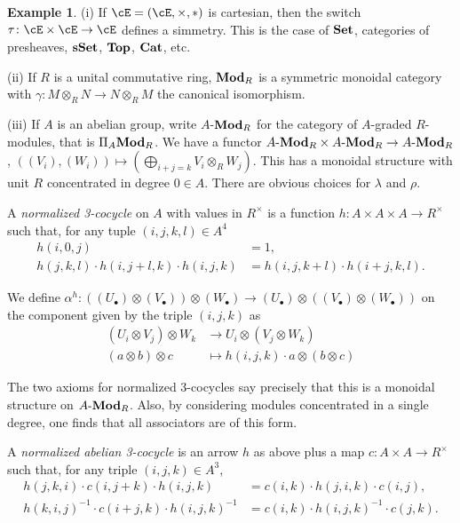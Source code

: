 \documentclass[a4paper,11pt,oneside,openany]{scrbook}
\newcommand{\catname}[1]{{\normalfont\textbf{#1}}}
\newcommand{\Set}{\catname{Set}}
\newcommand{\Top}{\catname{Top}}
\newcommand{\Mod}{\catname{Mod}}
\newcommand{\sSet}{\catname{sSet}}
\newcommand{\Cat}{\catname{Cat}}
\theoremstyle{definition}
\theoremstyle{definition}
\newtheorem{exmp}[thm]{Example}
\begin{document}
\begin{exmp}
\item[(i)] If $\cE=(\cE,\times,*)$ is cartesian, then the switch $\tau\colon\cE\times\cE\rightarrow\cE$ defines a simmetry. This is the case of $\Set$, categories of presheaves, $\sSet$, $\Top$, $\Cat$, etc.

\item[(ii)] If $R$ is a unital commutative ring, $\Mod_R$ is a symmetric monoidal category with $\gamma\colon M\otimes_RN\rightarrow N\otimes_RM$ the canonical isomorphism.

\item[(iii)] If $A$ is an abelian group, write $A$-$\Mod_R$ for the category of $A$-graded $R$-modules, that is $\Pi_A\Mod_R$. We have a functor $A\text{-}\Mod_R\times A\text{-}\Mod_R\rightarrow A\text{-}\Mod_R$, $((V_i),(W_i))\mapsto (\bigoplus_{i+j=k}V_i\otimes_RW_j)$. This has a monoidal structure with unit $R$ concentrated in degree $0\in A$. There are obvious choices for $\lambda$ and $\rho$.

A \emph{normalized 3-cocycle} on $A$ with values in $R^\times$ is a function $h\colon A\times A\times A\rightarrow R^\times$ such that, for any tuple $(i,j,k,l)\in A^4$
\begin{align*}
    h(i,0,j) &=1, \\
    h(j,k,l)\cdot h(i,j+l,k)\cdot h(i,j,k) &=h(i,j,k+l)\cdot h(i+j,k,l).
\end{align*}

We define $\alpha^h\colon ((U_\bullet)\otimes(V_\bullet))\otimes (W_\bullet)\rightarrow (U_\bullet)\otimes ((V_\bullet)\otimes(W_\bullet))$ on the component given by the triple $(i,j,k)$ as
\begin{align*}
    (U_i\otimes V_j)\otimes W_k &\rightarrow U_i\otimes(V_j\otimes W_k) \\
    (a\otimes b)\otimes c &\mapsto h(i,j,k)\cdot a\otimes (b\otimes c)
\end{align*}

The two axioms for normalized 3-cocycles say precisely that this is a monoidal structure on $A\text{-}\Mod_R$. Also, by considering modules concentrated in a single degree, one finds that all associators are of this form.

A \emph{normalized abelian 3-cocycle} is an arrow $h$ as above plus a map $c\colon A\times A\rightarrow R^\times$ such that, for any triple $(i,j,k)\in A^3$,
\begin{align*}
    h(j,k,i)\cdot c(i,j+k)\cdot h(i,j,k) &=c(i,k)\cdot h(j,i,k)\cdot c(i,j), \\
    h(k,i,j)^{-1}\cdot c(i+j,k)\cdot h(i,j,k)^{-1} &=c(i,k)\cdot h(i,j,k)^{-1}\cdot c(j,k).
\end{align*}


\end{exmp}
\end{document}
